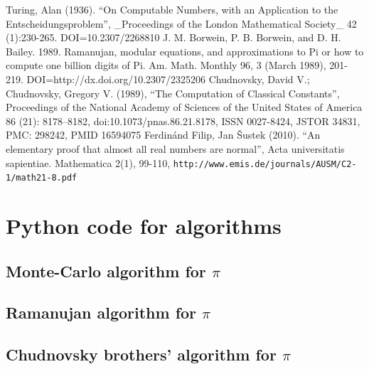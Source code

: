 \documentclass[10pt]{article}
\begin{document}
\pagebreak
\begin{thebibliography}{9}
Turing, Alan (1936). ``On Computable Numbers, with an Application to the Entscheidungsproblem'', \_Proceedings of the London Mathematical Society\_ 42 (1):230-265. DOI=10.2307/2268810
J. M. Borwein, P. B. Borwein, and D. H. Bailey. 1989. Ramanujan, modular equations, and approximations to Pi or how to compute one billion digits of Pi. Am. Math. Monthly 96, 3 (March 1989), 201-219. DOI=http://dx.doi.org/10.2307/2325206
 Chudnovsky, David V.; Chudnovsky, Gregory V. (1989), ``The Computation of Classical Constants'', Proceedings of the National Academy of Sciences of the United States of America 86 (21): 8178–8182, doi:10.1073/pnas.86.21.8178, ISSN 0027-8424, JSTOR 34831, PMC: 298242, PMID 16594075
Ferdinánd Filip, Jan Šustek (2010). ``An elementary proof that almost all real numbers are normal'', Acta universitatis sapientiae. Mathematica 2(1), 99-110, \texttt{http://www.emis.de/journals/AUSM/C2-1/math21-8.pdf}
\end{thebibliography}

\newpage
\appendix
\section{Python code for algorithms}\label{AppA}
\subsection{Monte-Carlo algorithm for $\pi$}

\subsection{Ramanujan algorithm for $\pi$}

\subsection{Chudnovsky brothers' algorithm for $\pi$}

\end{document}
